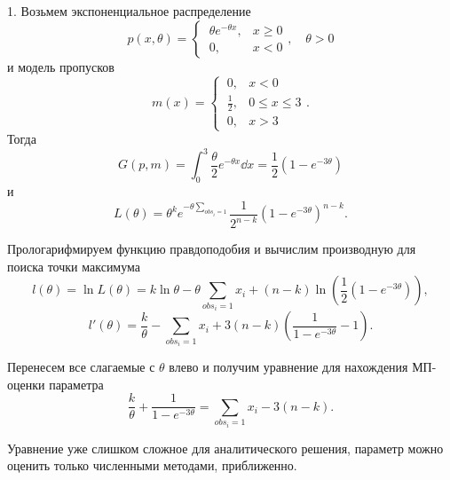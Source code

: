     \vspace{0.2cm}
    1. Возьмем экспоненциальное распределение
    \begin{equation*}
        p(x, \theta) = \left\{\
            \begin{array}{ll}
                \theta e^{-\theta x}, & x \geq 0 \\
                0, & x < 0
            \end{array}\right., \quad \theta > 0
    \end{equation*} 
    и модель пропусков
    \begin{equation*}
        m(x) = \left\{\
            \begin{array}{ll}
                0, & x < 0 \\
                \frac12, & 0 \leq x \leq 3 \\
                0, & x > 3
            \end{array}\right. .
    \end{equation*}
    Тогда
    \begin{equation*}
        G(p, m) = \int_{0}^{3}\frac{\theta}{2}e^{-\theta x}\dd x = \frac12 (1 - e^{-3\theta})
    \end{equation*}
    и
    \begin{equation*}
        L(\theta) = \theta^k e^{-\theta\sum_{obs_i = 1}}\frac{1}{2^{n-k}}(1 - e^{-3\theta})^{n - k}.
    \end{equation*}

    Прологарифмируем функцию правдоподобия и вычислим производную для поиска точки максимума
    \begin{equation*}
        l(\theta) = \ln L(\theta) = k\ln\theta - \theta\sum_{obs_i = 1}x_i + (n - k)\ln\left(\frac12(1 - e^{-3\theta})\right),
    \end{equation*}
    \begin{equation*}
        l'(\theta) = \frac{k}{\theta} - \sum_{obs_i = 1}x_i + 3(n - k)\left(\frac{1}{1 - e^{-3\theta}} - 1\right).
    \end{equation*}

    Перенесем все слагаемые с $\theta$ влево и получим уравнение для нахождения МП-оценки параметра
    \begin{equation*}
        \frac{k}{\theta} + \frac{1}{1 - e^{-3\theta}} = \sum_{obs_i = 1}x_i - 3(n - k).
    \end{equation*}

    Уравнение уже слишком сложное для аналитического решения, параметр можно оценить только численными методами, приближенно. 

